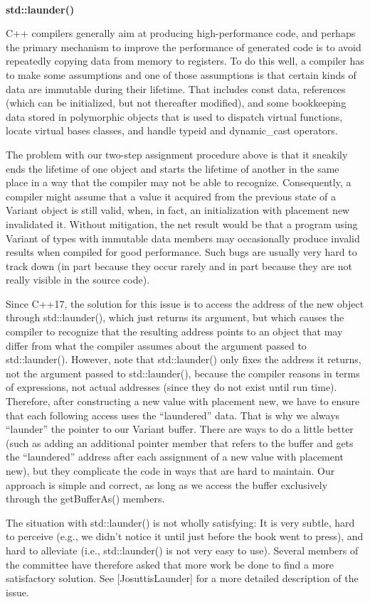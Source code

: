 \hspace*{\fill} \\ %
\noindent
\textbf{std::launder()}

C++ compilers generally aim at producing high-performance code, and perhaps the primary mechanism to improve the performance of generated code is to avoid repeatedly copying data from memory to registers. To do this well, a compiler has to make some assumptions and one of those assumptions is that certain kinds of data are immutable during their lifetime. That includes const data, references (which can be initialized, but not thereafter modified), and some bookkeeping data stored in polymorphic objects that is used to dispatch virtual functions, locate virtual bases classes, and handle typeid and dynamic\_cast operators.

The problem with our two-step assignment procedure above is that it sneakily ends the lifetime of one object and starts the lifetime of another in the same place in a way that the compiler may not be able to recognize. Consequently, a compiler might assume that a value it acquired from the previous state of a Variant object is still valid, when, in fact, an initialization with placement new invalidated it. Without mitigation, the net result would be that a program using Variant of types with immutable data members may occasionally produce invalid results when compiled for good performance. Such bugs are usually very hard to track down (in part because they occur rarely and in part because they are not really visible in the source code).

Since C++17, the solution for this issue is to access the address of the new object through std::launder(), which just returns its argument, but which causes the compiler to recognize that the resulting address points to an object that may differ from what the compiler assumes about the argument passed to std::launder(). However, note that std::launder() only fixes the address it returns, not the argument passed to std::launder(), because the compiler reasons in terms of expressions, not actual addresses (since they do not exist until run time). Therefore, after constructing a new value with placement new, we have to ensure that each following access uses the “laundered” data. That is why we always “launder” the pointer to our Variant buffer. There are ways to do a little better (such as adding an additional pointer member that refers to the buffer and gets the “laundered” address after each assignment of a new value with placement new), but they complicate the code in ways that are hard to maintain. Our approach is simple and correct, as long as we access the buffer exclusively through the getBufferAs() members.

The situation with std::launder() is not wholly satisfying: It is very subtle, hard to perceive (e.g., we didn’t notice it until just before the book went to press), and hard to alleviate (i.e., std::launder() is not very easy to use). Several members of the committee have therefore asked that more work be done to find a more satisfactory solution. See [JosuttisLaunder] for a more detailed description of the issue.